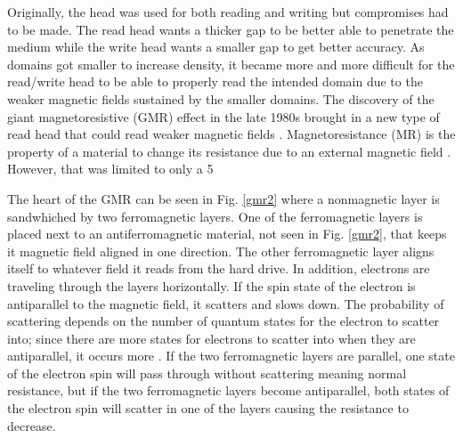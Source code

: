 \documentclass[ notitlepage, numerical, 11pt]{revtex4-1} %
\begin{document}
Originally, the head was used for both reading and writing but compromises had to be made. The read head wants a thicker gap to be better able to penetrate the medium while the write head wants a smaller gap to get better accuracy. As domains got smaller to increase density, it became more and more difficult for the read/write head to be able to properly read the intended domain due to the weaker magnetic fields sustained by the smaller domains. The discovery of the giant magnetoresistive (GMR) effect in the late 1980s brought in a new type of read head that could read weaker magnetic fields \cite{gmr}. Magnetoresistance (MR) is the property of a material to change its resistance due to an external magnetic field \cite{gmr}. However, that was limited to only a 5%


The heart of the GMR can be seen in Fig. \ref{gmr2} where a nonmagnetic layer is sandwhiched by two ferromagnetic layers. One of the ferromagnetic layers is placed next to an antiferromagnetic material, not seen in Fig. \ref{gmr2}, that keeps it magnetic field aligned in one direction. The other ferromagnetic layer aligns itself to whatever field it reads from the hard drive. In addition, electrons are traveling through the layers horizontally. If the spin state of the electron is antiparallel to the magnetic field, it scatters and slows down. The probability of scattering depends on the number of quantum states for the electron to scatter into; since there are more states for electrons to scatter into when they are antiparallel, it occurs more \cite{gmr}. If the two ferromagnetic layers are parallel, one state of the electron spin will pass through without scattering meaning normal resistance, but if the two ferromagnetic layers become antiparallel, both states of the electron spin will scatter in one of the layers causing the resistance to decrease.
\end{document}
